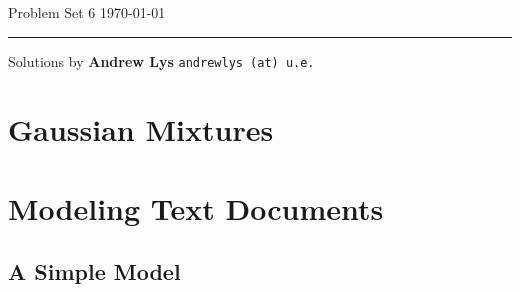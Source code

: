 \documentclass{amsart}
\theoremstyle{definition}
\begin{document}
\noindent
Problem Set 6   \hfill \today  %
\smallskip
\hrule
\smallskip
\noindent
Solutions by {\bf Andrew Lys} \qquad   %
  {\tt andrewlys (at) u.e.}      %

\vspace{0.5cm}

\section{Gaussian Mixtures}
\section{Modeling Text Documents}
\subsection{A Simple Model}
\end{document}
